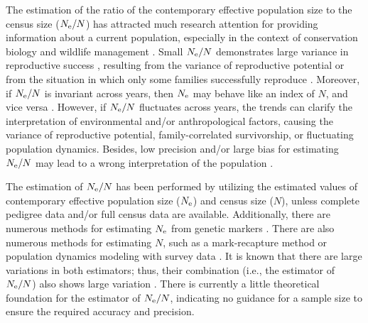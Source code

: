 \documentclass[12pt, English]{article}
\begin{document}
\begin{spacing}{1.9}
The estimation of the ratio of the contemporary effective population size to the census size ($N_{\rm e}/N$) has attracted much research attention for providing information about a current population, especially in the context of conservation biology and wildlife management \cite[]{Palstra_2012,FRANKHAM201456}. Small $N_{\rm e}/N$ demonstrates large variance in reproductive success \cite[]{Wang:2016aa, JFB:JFB13143, Akita_2019}, resulting from the variance of reproductive potential \cite[e.g., the big old fat fecund female fish hypothesis;][]{Hixon_2014} or from the situation in which only some families successfully reproduce \cite[referred to as the ``Sweepstakes reproductive success'' hypothesis,][]{hedgecock2011sweepstakes}. Moreover, if $N_{\rm e}/N$ is invariant across years, then $N_{\rm e}$ may behave like an index of $N$, and vice versa \cite[]{luikart2010estimation}. However, if $N_{\rm e}/N$ fluctuates across years, the trends can clarify the interpretation of environmental and/or anthropological factors, causing the variance of reproductive potential, family-correlated survivorship, or fluctuating population dynamics. Besides, low precision and/or large bias for estimating $N_{\rm e}/N$ may lead to a wrong interpretation of the population \cite[]{Tallmon:2012aa}.

The estimation of $N_{\rm e}/N$ has been performed by utilizing the estimated values of contemporary effective population size ($N_{\rm e}$) and census size ($N$), unless complete pedigree data and/or full census data are available. Additionally, there are numerous methods for estimating $N_{\rm e}$ from genetic markers \cite[][and the references contained therein]{Wang:2016aa}. There are also numerous methods for estimating $N$, such as a mark-recapture method or population dynamics modeling with survey data \cite[e.g.,][]{seber1982estimation,quinn1999quantitative,kery2011bayesian,methot2013stock}. It is known that there are large variations in both estimators; thus, their combination (i.e., the estimator of $N_{\rm e}/N$) also shows large variation \cite[]{Palstra_2012,Marandel_2018}. There is currently a little theoretical foundation for the estimator of $N_{\rm e}/N$, indicating no guidance for a sample size to ensure the required accuracy and precision. 


\end{spacing}
\end{document}
